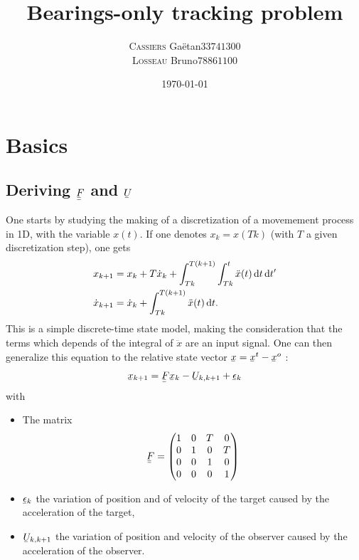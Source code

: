 \documentclass[english,DIV=13]{scrreprt}
\title{Bearings-only tracking problem}
\subtitle{}
\author{\begin{tabular}{cc}
	\textsc{Cassiers} Gaëtan  & 	$33741300$ \\
	\textsc{Losseau} Bruno 	&	$78861100$
	 \end{tabular}}
\date{\today}
\newcommand{\ubar}[1]{\underaccent{\bar}{#1}}
\newcommand{\uvec}[1]{\ubar{#1}}
\newcommand{\umatrix}[1]{\ubar{\ubar{#1}}}
\begin{document}
\maketitle


\tableofcontents


\chapter{Basics}
\section*{Deriving $\umatrix{F}$ and $\uvec{U}$}

One starts by studying the making of a discretization of a movemement process in 1D, with the
variable $x(t)$. If one denotes $x_k = x(Tk)$ (with $T$ a given discretization step), one gets
\begin{align*}
    x_{k+1} &= x_k + T\dot{x}_k + \int_{Tk}^{T(k+1)}\int_{Tk}^{t}\ddot{x}(t)\operatorname{d}\! t\operatorname{d}\! t' \\
    \dot{x}_{k+1} &=  \dot{x}_k + \int_{Tk}^{T(k+1)}\ddot{x}(t)\operatorname{d}\! t.
\end{align*}
This is a simple discrete-time state model, making the consideration that the terms which depends of
the integral of $\ddot{x}$
are an input signal.
One can then generalize this equation to the relative state vector $\uvec{x} = \uvec{x}^t - \uvec{x}^o$ :
\[\uvec{x}_{k+1} = \umatrix{F}\uvec{x}_k - \uvec{U}_{k,k+1} + \uvec{\epsilon}_k\]
with
\begin{itemize}
    \item The matrix
        \[\umatrix{F} =
        \begin{pmatrix}
            1 & 0 & T & 0 \\
            0 & 1 & 0 & T \\   
            0 & 0 & 1 & 0 \\
            0 & 0 & 0 & 1   
        \end{pmatrix}
        \]
    \item $\uvec{\epsilon}_k$ the variation of position and of velocity of the target caused by the
acceleration of the target,
    \item $\uvec{U}_{k,k+1}$ the variation of position and velocity of
the observer caused by the acceleration of the observer.
\end{itemize}
\end{document}
